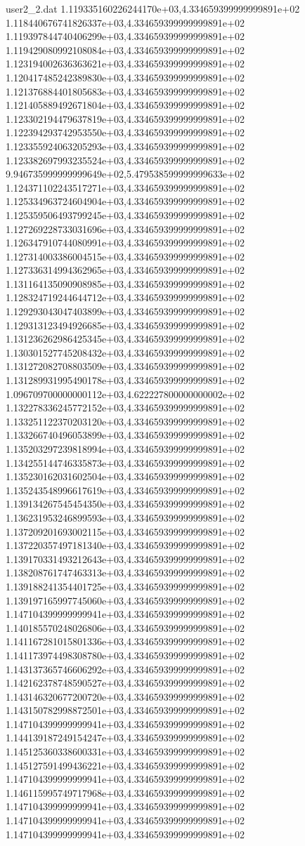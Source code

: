 \begin{filecontents}{user2_2.dat}
1.119335160226244170e+03,4.334659399999999891e+02
1.118440676741826337e+03,4.334659399999999891e+02
1.119397844740406299e+03,4.334659399999999891e+02
1.119429080992108084e+03,4.334659399999999891e+02
1.123194002636363621e+03,4.334659399999999891e+02
1.120417485242389830e+03,4.334659399999999891e+02
1.121376884401805683e+03,4.334659399999999891e+02
1.121405889492671804e+03,4.334659399999999891e+02
1.123302194479637819e+03,4.334659399999999891e+02
1.122394293742953550e+03,4.334659399999999891e+02
1.123355924063205293e+03,4.334659399999999891e+02
1.123382697993235524e+03,4.334659399999999891e+02
9.946735999999999649e+02,5.479538599999999633e+02
1.124371102243517271e+03,4.334659399999999891e+02
1.125334963724604904e+03,4.334659399999999891e+02
1.125359506493799245e+03,4.334659399999999891e+02
1.127269228733031696e+03,4.334659399999999891e+02
1.126347910744080991e+03,4.334659399999999891e+02
1.127314003386004515e+03,4.334659399999999891e+02
1.127336314994362965e+03,4.334659399999999891e+02
1.131164135090908985e+03,4.334659399999999891e+02
1.128324719244644712e+03,4.334659399999999891e+02
1.129293043047403899e+03,4.334659399999999891e+02
1.129313123494926685e+03,4.334659399999999891e+02
1.131236262986425345e+03,4.334659399999999891e+02
1.130301527745208432e+03,4.334659399999999891e+02
1.131272082708803509e+03,4.334659399999999891e+02
1.131289931995490178e+03,4.334659399999999891e+02
1.096709700000000112e+03,4.622227800000000002e+02
1.132278336245772152e+03,4.334659399999999891e+02
1.133251122370203120e+03,4.334659399999999891e+02
1.133266740496053899e+03,4.334659399999999891e+02
1.135203297239818994e+03,4.334659399999999891e+02
1.134255144746335873e+03,4.334659399999999891e+02
1.135230162031602504e+03,4.334659399999999891e+02
1.135243548996617619e+03,4.334659399999999891e+02
1.139134267545454350e+03,4.334659399999999891e+02
1.136231953246899593e+03,4.334659399999999891e+02
1.137209201693002115e+03,4.334659399999999891e+02
1.137220357497181340e+03,4.334659399999999891e+02
1.139170331493212643e+03,4.334659399999999891e+02
1.138208761747463313e+03,4.334659399999999891e+02
1.139188241354401725e+03,4.334659399999999891e+02
1.139197165997745060e+03,4.334659399999999891e+02
1.147104399999999941e+03,4.334659399999999891e+02
1.140185570248026806e+03,4.334659399999999891e+02
1.141167281015801336e+03,4.334659399999999891e+02
1.141173974498308780e+03,4.334659399999999891e+02
1.143137365746606292e+03,4.334659399999999891e+02
1.142162378748590527e+03,4.334659399999999891e+02
1.143146320677200720e+03,4.334659399999999891e+02
1.143150782998872501e+03,4.334659399999999891e+02
1.147104399999999941e+03,4.334659399999999891e+02
1.144139187249154247e+03,4.334659399999999891e+02
1.145125360338600331e+03,4.334659399999999891e+02
1.145127591499436221e+03,4.334659399999999891e+02
1.147104399999999941e+03,4.334659399999999891e+02
1.146115995749717968e+03,4.334659399999999891e+02
1.147104399999999941e+03,4.334659399999999891e+02
1.147104399999999941e+03,4.334659399999999891e+02
1.147104399999999941e+03,4.334659399999999891e+02
\end{filecontents}